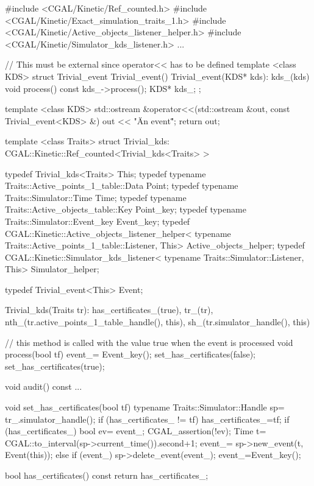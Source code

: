  \label{fig:kds_trivial_usage_program}

\begin{ccExampleCode}
#include <CGAL/Kinetic/Ref_counted.h>
#include <CGAL/Kinetic/Exact_simulation_traits_1.h>
#include <CGAL/Kinetic/Active_objects_listener_helper.h>
#include <CGAL/Kinetic/Simulator_kds_listener.h>
...

// This must be external since operator<< has to be defined
template <class KDS>
struct Trivial_event
{
  Trivial_event(){}
  Trivial_event(KDS* kds): kds_(kds) {
  }
  void process() const
  {
    kds_->process();
  }
  KDS* kds_;
};

template <class KDS>
std::ostream &operator<<(std::ostream &out,
			 const Trivial_event<KDS> &) {
  out << "\"An event\"";
  return out;
}


template <class Traits>
struct Trivial_kds: CGAL::Kinetic::Ref_counted<Trivial_kds<Traits> >
{
  typedef Trivial_kds<Traits> This;
  typedef typename Traits::Active_points_1_table::Data Point;
  typedef typename Traits::Simulator::Time Time;
  typedef typename Traits::Active_objects_table::Key Point_key;
  typedef typename Traits::Simulator::Event_key Event_key;
  typedef CGAL::Kinetic::Active_objects_listener_helper<
    typename Traits::Active_points_1_table::Listener, This> Active_objects_helper;
  typedef CGAL::Kinetic::Simulator_kds_listener<
    typename Traits::Simulator::Listener, This> Simulator_helper;

  typedef Trivial_event<This> Event;

  Trivial_kds(Traits tr): has_certificates_(true),
			  tr_(tr),
			  nth_(tr.active_points_1_table_handle(), this),
			  sh_(tr.simulator_handle(), this){}

  // this method is called with the value true when the event is processed
  void process(bool tf) {
     event_= Event_key();
     set_has_certificates(false);
     set_has_certificates(true);
  }

  void audit() const
  {
     ...
  }

  void set_has_certificates(bool tf) {
    typename Traits::Simulator::Handle sp= tr_.simulator_handle();
    if (has_certificates_ != tf) {
      has_certificates_=tf;
      if (has_certificates_) {
	bool ev= event_;
	CGAL_assertion(!ev);
	Time t= CGAL::to_interval(sp->current_time()).second+1;
	event_= sp->new_event(t, Event(this));
      } else if (event_) {
	sp->delete_event(event_);
	event_=Event_key();
      }
    }
  }

  bool has_certificates() const {
    return has_certificates_;
  }

}
\end{ccExampleCode}
